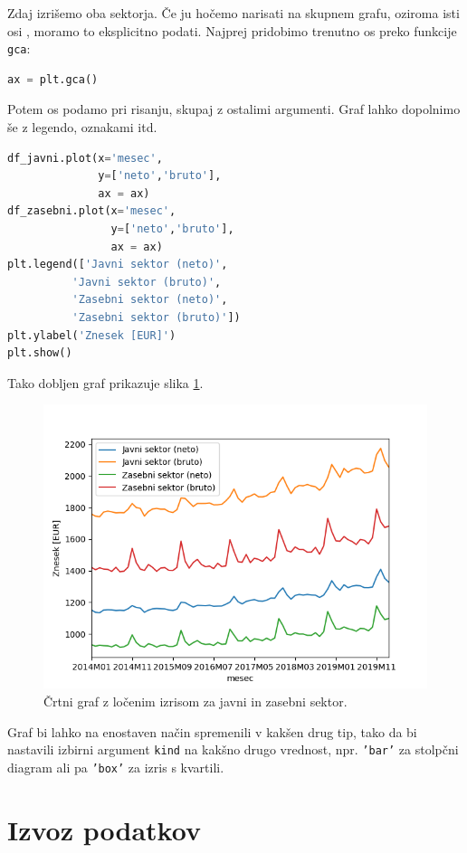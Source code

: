Zdaj izrišemo oba sektorja. Če ju hočemo narisati na skupnem grafu, oziroma isti osi , moramo to eksplicitno podati. Najprej pridobimo trenutno os preko funkcije \texttt{gca}:
\begin{lstlisting}[language=python]
ax = plt.gca()
\end{lstlisting}
Potem os podamo pri risanju, skupaj z ostalimi argumenti. Graf lahko dopolnimo še z legendo, oznakami itd.
\begin{lstlisting}[language=python]
df_javni.plot(x='mesec',
              y=['neto','bruto'],
              ax = ax)
df_zasebni.plot(x='mesec',
                y=['neto','bruto'],
                ax = ax)
plt.legend(['Javni sektor (neto)',
          'Javni sektor (bruto)',
          'Zasebni sektor (neto)',
          'Zasebni sektor (bruto)'])
plt.ylabel('Znesek [EUR]')
plt.show()
\end{lstlisting}
Tako dobljen graf prikazuje slika \ref{img:plt_pandas2}.
\begin{figure}
    \includegraphics[width=\linewidth]{img/plt_pandas2.png}
    \caption{Črtni graf z ločenim izrisom za javni in zasebni sektor.}
    \label{img:plt_pandas2}
\end{figure}
Graf bi lahko na enostaven način spremenili v kakšen drug tip, tako da bi nastavili izbirni argument \texttt{kind} na kakšno drugo vrednost, npr. \texttt{'bar'} za stolpčni diagram ali pa \texttt{'box'} za izris s kvartili.

\section{Izvoz podatkov}

